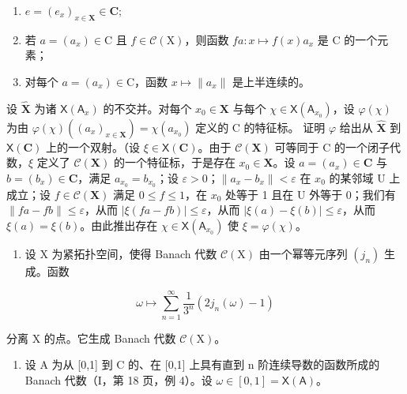 \begin{enumerate}
\def\labelenumi{(\roman{enumi})}
\item
  \(e = (e_x)_{x \in \mathbf{X}} \in \mathbf{C};\)
\item
  若 \(a = (a_x) \in \mathrm{C}\) 且 \(f \in \mathcal{C}(\mathrm{X})\)，则函数 \(fa: x \mapsto f(x)a_x\) 是 \(\mathrm{C}\) 的一个元素；
\item
  对每个 \(a = (a_x) \in \mathrm{C}\)，函数 \(x \mapsto \|a_x\|\) 是上半连续的。
\end{enumerate}

设 \(\widehat{\mathbf{X}}\) 为诸 \(\mathsf{X}(\mathsf{A}_x)\) 的不交并。对每个 \(x_0 \in \mathbf{X}\) 与每个 \(\chi \in \mathsf{X}(\mathsf{A}_{x_0})\)，设 \(\varphi(\chi)\) 为由 \(\varphi(\chi)((a_x)_{x \in \mathbf{X}}) = \chi(a_{x_0})\) 定义的 C 的特征标。 证明 \(\varphi\) 给出从 \(\widehat{\mathbf{X}}\) 到 \(\mathsf{X}(\mathbf{C})\) 上的一个双射。（设 \(\xi \in \mathsf{X}(\mathbf{C})\)。由于 \(\mathcal{C}(\mathbf{X})\) 可等同于 C 的一个闭子代数，\(\xi\) 定义了 \(\mathcal{C}(\mathbf{X})\) 的一个特征标，于是存在 \(x_0 \in \mathbf{X}\)。设 \(a = (a_x) \in \mathbf{C}\) 与 \(b = (b_x) \in \mathbf{C}\)，满足 \(a_{x_0} = b_{x_0}\)；设 \(\varepsilon > 0\)；\(\|a_x - b_x\| < \varepsilon\) 在 \(x_0\) 的某邻域 U 上成立；设 \(f \in \mathcal{C}(\mathbf{X})\) 满足 \(0 \leqslant f \leqslant 1\)，在 \(x_0\) 处等于 1 且在 U 外等于 0；我们有 \(\|fa - fb\| \leqslant \varepsilon\)，从而 \(|\xi(fa - fb)| \leqslant \varepsilon\)，从而 \(|\xi(a) - \xi(b)| \leqslant \varepsilon\)，从而 \(\xi(a) = \xi(b)\)。由此推出存在 \(\chi \in \mathsf{X}(\mathsf{A}_{x_0})\) 使 \(\xi = \varphi(\chi)\)。

\begin{enumerate}
\def\labelenumi{\arabic{enumi})}
\setcounter{enumi}{3}
\tightlist
\item
  设 X 为紧拓扑空间，使得 Banach 代数 \(\mathcal{C}(\mathrm{X})\) 由一个幂等元序列 \((j_n)\) 生成。函数
\end{enumerate}

\[
\omega \mapsto \sum_ {n = 1} ^ {\infty} \frac {1}{3 ^ {n}} (2 j _ {n} (\omega) - 1)
\]

分离 X 的点。它生成 Banach 代数 \(\mathcal{C}(\mathrm{X})\)。

\begin{enumerate}
\def\labelenumi{\arabic{enumi})}
\setcounter{enumi}{4}
\tightlist
\item
  设 A 为从 {[}0,1{]} 到 C 的、在 {[}0,1{]} 上具有直到 n 阶连续导数的函数所成的 Banach 代数（I，第 18 页，例 4）。设 \(\omega \in [0,1] = \mathsf{X}(\mathsf{A})\)。
\end{enumerate}

